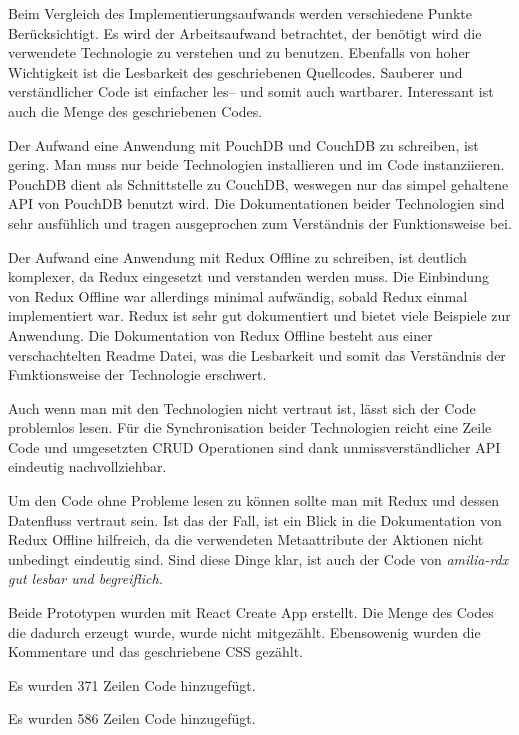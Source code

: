 Beim Vergleich des Implementierungsaufwands werden verschiedene Punkte Berücksichtigt.
Es wird der Arbeitsaufwand betrachtet, der benötigt wird die verwendete Technologie zu verstehen und zu benutzen.
Ebenfalls von hoher Wichtigkeit ist die Lesbarkeit des geschriebenen Quellcodes.
Sauberer und verständlicher Code ist einfacher les-- und somit auch wartbarer. Interessant ist auch die Menge des geschriebenen Codes.
%
\begin{description}[leftmargin=0cm,style=nextline]
  \item[amilia-qouch]
  Der Aufwand eine Anwendung mit PouchDB und CouchDB zu schreiben, ist gering.
  Man muss nur beide Technologien installieren und im Code instanziieren.
  PouchDB dient als Schnittstelle zu CouchDB, weswegen nur das simpel gehaltene \gls{API} von PouchDB benutzt wird.
  Die Dokumentationen beider Technologien sind sehr ausfühlich und tragen ausgeprochen zum Verständnis der Funktionsweise bei.

  \item[amilia-rdx]
  Der Aufwand eine Anwendung mit Redux Offline zu schreiben, ist deutlich komplexer, da Redux eingesetzt und verstanden werden muss.
  Die Einbindung von Redux Offline war allerdings minimal aufwändig, sobald Redux einmal implementiert war.
  Redux ist sehr gut dokumentiert und bietet viele Beispiele zur Anwendung.
  Die Dokumentation von Redux Offline besteht aus einer verschachtelten Readme Datei, was die Lesbarkeit und somit das Verständnis der Funktionsweise der Technologie erschwert.
\end{description}
%
\begin{description}[leftmargin=0cm,style=nextline]
  \item[amilia-qouch]
  Auch wenn man mit den Technologien nicht vertraut ist, lässt sich der Code problemlos lesen.
  Für die Synchronisation beider Technologien reicht eine Zeile Code und umgesetzten \gls{CRUD} Operationen sind dank unmissverständlicher API eindeutig nachvollziehbar.
  \item[amilia-rdx] 
  Um den Code ohne Probleme lesen zu können sollte man mit Redux und dessen Datenfluss vertraut sein.
  Ist das der Fall, ist ein Blick in die Dokumentation von Redux Offline hilfreich, da die verwendeten Metaattribute der Aktionen nicht unbedingt eindeutig sind.
  Sind diese Dinge klar, ist auch der Code von \it{amilia-rdx} gut lesbar und begreiflich.
\end{description}
%
  Beide Prototypen wurden mit React Create App erstellt.
  Die Menge des Codes die dadurch erzeugt wurde, wurde nicht mitgezählt. Ebensowenig wurden die Kommentare und das geschriebene \gls{CSS} gezählt.
\begin{description}[leftmargin=0cm,style=nextline]
    \item[amilia-qouch]
    Es wurden 371 Zeilen Code hinzugefügt.
    \item[amilia-rdx] 
    Es wurden 586 Zeilen Code hinzugefügt.
\end{description}